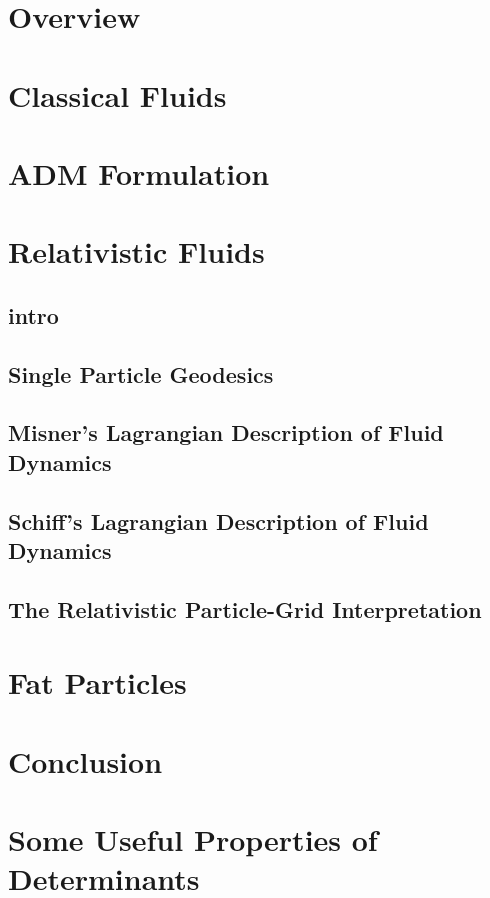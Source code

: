 \documentclass[12pt]{report}
\begin{document}
\chapter{Overview}

\chapter{Classical Fluids}


\chapter{ADM Formulation}


\chapter{Relativistic Fluids}
\section{intro}
\section{Single Particle Geodesics}
\section{Misner's Lagrangian Description of Fluid Dynamics}
\section{Schiff's Lagrangian Description of Fluid Dynamics}
\section{The Relativistic Particle-Grid Interpretation}


\chapter{Fat Particles}


\chapter{Conclusion}

\appendix
\chapter{Some Useful Properties of Determinants}

\end{document}
